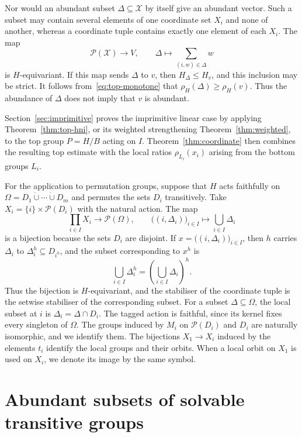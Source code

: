 \documentclass[10pt]{amsart}
\theoremstyle{definition}
\renewcommand{\leq}{\leqslant}
\renewcommand{\geq}{\geqslant}
\newcommand{\pow}{\mathcal{P}}
\numberwithin{equation}{section}
\numberwithin{table}{section}
\begin{document}
Nor would an abundant subset $\Delta\subseteq\mathcal X$ by itself give an
abundant vector. Such a subset may contain several elements of one coordinate
set $X_i$ and none of another, whereas a coordinate tuple contains exactly
one element of each $X_i$. The map
$$
  \pow(\mathcal X)\longrightarrow V,\qquad
  \Delta\longmapsto\sum_{(i,w)\in\Delta}w
$$
is $H$-equivariant. If this map sends $\Delta$ to $v$, then
$H_\Delta\leq H_v$, and this inclusion may be strict. It follows
from~\eqref{eq:top-monotone} that $\rho_H(\Delta)\geq\rho_H(v)$. Thus the
abundance of $\Delta$ does not imply that $v$ is abundant.

Section~\ref{sec:imprimitive} proves the imprimitive linear case by applying
Theorem~\ref{thm:top-hni}, or its weighted strengthening
Theorem~\ref{thm:weighted}, to the top group $P=H/B$ acting on $I$.
Theorem~\ref{thm:coordinate} then combines the resulting top estimate with
the local ratios $\rho_{L_i}(x_i)$ arising from the bottom groups $L_i$.

For the application to permutation groups, suppose that $H$ acts faithfully on
$\Omega=D_1\mathbin{\dot\cup}\cdots\mathbin{\dot\cup}D_m$ and permutes the
sets $D_i$ transitively. Take
$X_i=\{i\}\times\pow(D_i)$ with the natural action. The map
$$
  \prod_{i\in I}X_i\longrightarrow\pow(\Omega),
  \qquad
  \bigl((i,\Delta_i)\bigr)_{i\in I}\longmapsto
  \bigcup_{i\in I}\Delta_i
$$
is a bijection because the sets $D_i$ are disjoint. If
$x=\bigl((i,\Delta_i)\bigr)_{i\in I}$, then $h$ carries $\Delta_i$ to
$\Delta_i^h\subseteq D_{i^h}$, and the subset corresponding to $x^h$ is
$$
  \bigcup_{i\in I}\Delta_i^h
  =\left(\bigcup_{i\in I}\Delta_i\right)^h.
$$
Thus the bijection is $H$-equivariant, and the stabiliser of the coordinate
tuple is the setwise stabiliser of the corresponding subset. For a subset
$\Delta\subseteq\Omega$, the local subset at $i$ is
$\Delta_i=\Delta\cap D_i$. The tagged action is faithful, since its kernel
fixes every singleton of $\Omega$. The groups induced by $M_i$ on
$\pow(D_i)$ and $D_i$ are naturally isomorphic, and we identify them.
The bijections $X_1\longrightarrow X_i$ induced by the elements $t_i$
identify the local groups and their orbits. When a local orbit on $X_1$ is
used on $X_i$, we denote its image by the same symbol.

\section{Abundant subsets of solvable transitive groups}
\label{sec:top-hni}
\end{document}
